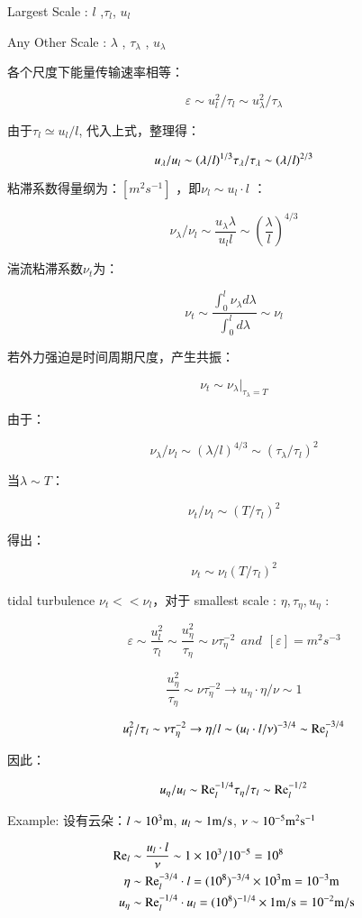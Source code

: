 \documentclass[fontset=windows]{report}
\begin{document}
Largest Scale : \(l\) ,\(\tau_l\), \(u_l\)

Any Other Scale : \(\lambda\) , \(\tau_{\lambda}\) , \(u_{\lambda}\)

各个尺度下能量传输速率相等：

\[\varepsilon \sim u_l^2/\tau_l\sim u_{\lambda}^2/\tau_{\lambda}\]

由于\(\tau_l\simeq u_l/l\), 代入上式，整理得：

\[u_{\lambda}/u_l \sim (\lambda/l)^{1/3}  \\
\tau_{\lambda}/\tau_{\lambda} \sim (\lambda/l)^{2/3}\]

粘滞系数得量纲为：\([m^2s^{-1}]\) ，即\(\nu _l \sim u_l \cdot l\) ：

\[\nu_\lambda /\nu_l \sim \frac{u_\lambda \lambda}{u_l l}\sim (\frac{\lambda}{l})^{4/3}\]

湍流粘滞系数\(\nu_t\)为：

\[\nu_t\sim\frac{\int_0^l \nu_\lambda d\lambda}{\int_0^ld\lambda} \sim\nu_l\]

若外力强迫是时间周期尺度，产生共振：

\[\nu_t \sim \nu_\lambda |_{\tau _{\lambda}=T}\]

由于：

\[\nu_\lambda/\nu_l\sim(\lambda/l)^{4/3}\sim(\tau_\lambda/\tau_l)^2\]

当\(\lambda\sim T\)：

\[\nu_t/\nu_l \sim (T/\tau_l)^2\]

得出：

\[\nu_t \sim \nu_l(T/\tau_l)^2\]

tidal turbulence \(\nu_t<<\nu_l\)，对于 smallest scale :
\(\eta , \tau_\eta, u_\eta\) :

\[\varepsilon \sim \frac{u_l^2}{\tau_l}\sim \frac{u_\eta^2}{\tau_\eta}\sim \nu\tau_\eta^{-2}\ \ and \ \ [\varepsilon]=m^2s^{-3}\]

\[\frac{u_{\eta}^2}{\tau_{\eta}}\sim\nu\tau_{\eta}^{-2}\rightarrow u_\eta\cdot \eta/ \nu\sim1\]

\[u_l^2/\tau_l \sim \nu\tau_\eta^{-2}\rightarrow\eta/l\sim(u_l\cdot l/\nu)^{-3/4}\sim {\rm{Re}}_l^{-3/4}\]

因此：

\[u_\eta/u_l \sim {\rm{Re}} _l^{-1/4}\\
\tau_\eta/\tau_l\sim{\rm{Re}}_l^{-1/2}\]

Example: 设有云朵：\(l\sim10^3 \rm m\), \(u_l\sim 1\rm m/s\),
\(\nu\sim 10^{-5} \rm m^2s^{-1}\)

\begin{equation}
  \begin{aligned}
    {\rm{Re}}_l 
    &\sim \frac {u_l\cdot l}{\nu}\sim1\times 10^3/10^{-5}=10^8 \\
    \eta 
    &\sim {\rm{Re}}_l^{-3/4}\cdot l =(10^8)^{-3/4}\times10^3 {\rm m}=10^{-3}{\rm m}\\
    u_\eta 
    &\sim {\rm{Re}}_l^{-1/4}\cdot u_l=(10^8)^{-1/4}\times1 \rm m/s = 10^{-2}\rm m/s
    \end{aligned}
\end{equation}
\end{document}
